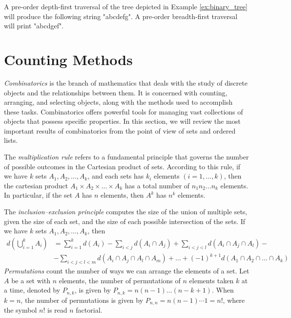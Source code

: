 \begin{example}
A pre-order depth-first traversal of the tree depicted in Example \ref{ex:binary_tree} will produce the following string "abcdefg". A pre-order breadth-first traversal will print "abcdgef".
\end{example}

%
%

\section{Counting Methods}
\label{sec:counting}

\emph{Combinatorics} is the branch of mathematics that deals with the study of discrete objects and the relationships between them. It is concerned with counting, arranging, and selecting objects, along with the methods used to accomplish these tasks. Combinatorics offers powerful tools for managing vast collections of objects that possess specific properties. In this section, we will review the most important results of combinatorics from the point of view of sets and ordered lists.

The \emph{multiplication rule} refers to a fundamental principle that governs the number of possible outcomes in the Cartesian product of sets. According to this rule, if we have $k$ sets $A_1, A_2, \ldots, A_k$, and each sets has $k_i$ elements $\left( i=1, \ldots, k \right)$, then the cartesian product $A_1 \times A_2 \times \ldots \times A_k$ has a total number of $n_1 n_2 \ldots n_k$ elements. In particular, if the set $A$ has $n$ elements, then $A^k$ has $n^k$ elements.

The \emph{inclusion–exclusion principle} computes the size of the union of multiple sets, given the size of each set, and the size of each possible intersection of the sets. If we have $k$ sets $A_1, A_2, \ldots, A_k$, then 
\begin{equation*}
\begin{split}
d \left( \bigcup_{i=1}^k A_i \right) & = \sum_{i=1}^k d \left( A_i \right) - \sum_{i<j} d \left( A_i \cap A_j \right) + \sum_{i<j<l} d \left( A_i \cap A_j \cap A_l \right) - \\
& - \sum_{i<j<l<m} d \left( A_i \cap A_j \cap A_l \cap A_m \right) + \ldots +  (-1)^{k+1} d \left( A_1 \cap A_2 \cap \ldots \cap A_k \right) 
\end{split}
\end{equation*}
\emph{Permutations} count the number of ways we can arrange the elements of a set. Let $A$ be a set with $n$ elements, the number of permutations of $n$ elements taken $k$ at a time, denoted by $P_{n,k}$, is given by $P_{n,k} = n \left( n-1 \right) \ldots \left( n-k+1 \right)$. When $k=n$, the number of permutations is given by $P_{n,n} = n \left( n-1 \right) \cdots 1=n!$, where the symbol $n!$ is read $n$ factorial.

